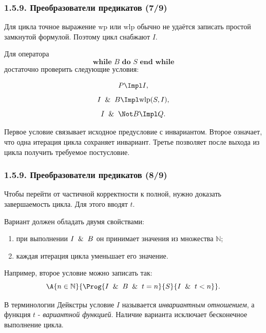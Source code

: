 \begin{frame}
\frametitle{1.5.9. Преобразователи предикатов (7/9)}

Для цикла точное выражение $\mathrm{wp}$ или $\mathrm{wlp}$
обычно не удаётся записать простой замкнутой формулой.
Поэтому цикл снабжают
$I$.

\smallskip
Для оператора
\[
\textbf{while } B \textbf{ do } S \textbf{ end while}
\]
достаточно проверить следующие условия:

\[
P \Impl I,
\]
\[
I \And B \Impl \mathrm{wlp}(S,I),
\]
\[
I \And \Not B \Impl Q.
\]

\begin{remark}
Первое условие связывает исходное предусловие с инвариантом.
Второе означает, что одна итерация цикла сохраняет инвариант.
Третье позволяет после выхода из цикла получить требуемое постусловие.
\end{remark}

\end{frame}

\begin{frame}
\frametitle{1.5.9. Преобразователи предикатов (8/9)}

Чтобы перейти от частичной корректности к полной,
нужно доказать завершаемость цикла.
Для этого вводят
$t$.

\smallskip
Вариант должен обладать двумя свойствами:

\begin{enumerate}
\item при выполнении $I \And B$ он принимает значения из
множества $\mathbb{N}$;

\item каждая итерация цикла уменьшает его значение.
\end{enumerate}

Например, второе условие можно записать так:
\[
\A{n\in\mathbb{N}}{
\Prog{I \And B \And t=n}{S}{I \And t<n}
}.
\]

\begin{remark}
В терминологии Дейкстры условие $I$ называется
\emph{инвариантным отношением},
а функция $t$ - \emph{вариантной функцией}.
Наличие варианта исключает бесконечное выполнение цикла.
\end{remark}

\end{frame}

